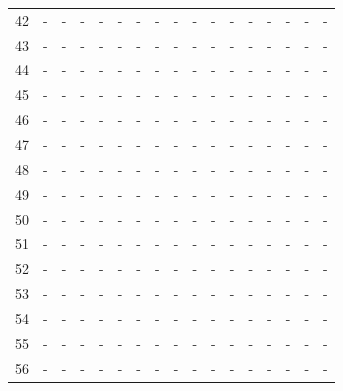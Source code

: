 \documentclass{report}
\begin{document}
\begin{appendices}
\begin{table}
\begin{tabular}{|c|cccc|cccc|cccc|cccc|}
42 &   -   &   -   &   -   &   -   &   -   &   -   &   -   &   -   &   -   &   -   &   -   &   -   &   -   &   -   &   -   &   -   \\
43 &   -   &   -   &   -   &   -   &   -   &   -   &   -   &   -   &   -   &   -   &   -   &   -   &   -   &   -   &   -   &   -   \\
44 &   -   &   -   &   -   &   -   &   -   &   -   &   -   &   -   &   -   &   -   &   -   &   -   &   -   &   -   &   -   &   -   \\
45 &   -   &   -   &   -   &   -   &   -   &   -   &   -   &   -   &   -   &   -   &   -   &   -   &   -   &   -   &   -   &   -   \\
46 &   -   &   -   &   -   &   -   &   -   &   -   &   -   &   -   &   -   &   -   &   -   &   -   &   -   &   -   &   -   &   -   \\
47 &   -   &   -   &   -   &   -   &   -   &   -   &   -   &   -   &   -   &   -   &   -   &   -   &   -   &   -   &   -   &   -   \\
48 &   -   &   -   &   -   &   -   &   -   &   -   &   -   &   -   &   -   &   -   &   -   &   -   &   -   &   -   &   -   &   -   \\
49 &   -   &   -   &   -   &   -   &   -   &   -   &   -   &   -   &   -   &   -   &   -   &   -   &   -   &   -   &   -   &   -   \\
50 &   -   &   -   &   -   &   -   &   -   &   -   &   -   &   -   &   -   &   -   &   -   &   -   &   -   &   -   &   -   &   -   \\
51 &   -   &   -   &   -   &   -   &   -   &   -   &   -   &   -   &   -   &   -   &   -   &   -   &   -   &   -   &   -   &   -   \\
52 &   -   &   -   &   -   &   -   &   -   &   -   &   -   &   -   &   -   &   -   &   -   &   -   &   -   &   -   &   -   &   -   \\
53 &   -   &   -   &   -   &   -   &   -   &   -   &   -   &   -   &   -   &   -   &   -   &   -   &   -   &   -   &   -   &   -   \\
54 &   -   &   -   &   -   &   -   &   -   &   -   &   -   &   -   &   -   &   -   &   -   &   -   &   -   &   -   &   -   &   -   \\
55 &   -   &   -   &   -   &   -   &   -   &   -   &   -   &   -   &   -   &   -   &   -   &   -   &   -   &   -   &   -   &   -   \\
56 &   -   &   -   &   -   &   -   &   -   &   -   &   -   &   -   &   -   &   -   &   -   &   -   &   -   &   -   &   -   &   -   \\

\end{tabular}
\end{table}
\end{appendices}
\end{document}
